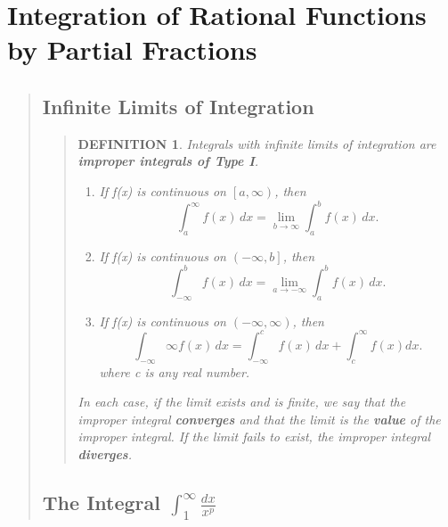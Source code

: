 \documentclass{report}
\newtheorem*{definition}{DEFINITION}
\begin{document}

\setcounter{section}{7}
\section{Integration of Rational Functions by Partial Fractions}
\begin{quote}

	\subsection{Infinite Limits of Integration}
	\begin{quote}

		\begin{definition}

			Integrals with infinite limits of integration are \textbf{improper integrals of Type I}.
			
			\begin{enumerate}
				\item If f(x) is continuous on $\left [ a,\infty \right )$, then $$\int_{a}^{\infty}f(x)\,dx = \lim_{b \to \infty} \int_{a}^{b}f(x)\,dx.$$
				\item If f(x) is continuous on $\left( -\infty, b\right ]$, then $$\int_{-\infty}^{b} f(x)\, dx = \lim_{a \to -\infty}\int_{a}^{b}f(x)\,dx.$$
				\item If f(x) is continuous on $\left(-\infty, \infty \right )$, then $$\int_{-\infty}{\infty}f(x)\, dx = \int_{-\infty}^{c}f(x)\,dx+\int_{c}^{\infty}f(x)dx.$$ where c is any real number.
			\end{enumerate}

			In each case, if the limit exists and is finite, we say that the improper integral \textbf{converges} and that the limit is the \textbf{value} of the improper integral. If the limit fails to exist, the improper integral \textbf{diverges}.

		\end{definition}

	\end{quote}

	\subsection{The Integral $\int_{1}^{\infty}\frac{dx}{x^p}$}
	\begin{quote}


\end{quote}
\end{quote}
\end{document}
